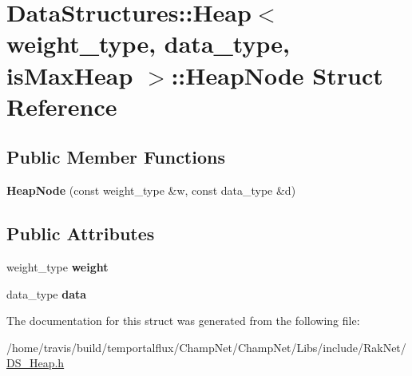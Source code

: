 \hypertarget{struct_data_structures_1_1_heap_1_1_heap_node}{\section{Data\-Structures\-:\-:Heap$<$ weight\-\_\-type, data\-\_\-type, is\-Max\-Heap $>$\-:\-:Heap\-Node Struct Reference}
\label{struct_data_structures_1_1_heap_1_1_heap_node}
}
\subsection*{Public Member Functions}
\begin{DoxyCompactItemize}
\item 
\hypertarget{struct_data_structures_1_1_heap_1_1_heap_node_a3b64e29489c62b0226bd7be578612869}{{\bfseries Heap\-Node} (const weight\-\_\-type \&w, const data\-\_\-type \&d)}\label{struct_data_structures_1_1_heap_1_1_heap_node_a3b64e29489c62b0226bd7be578612869}

\end{DoxyCompactItemize}
\subsection*{Public Attributes}
\begin{DoxyCompactItemize}
\item 
\hypertarget{struct_data_structures_1_1_heap_1_1_heap_node_a5e5aff8b34509387425d3ed21fbca515}{weight\-\_\-type {\bfseries weight}}\label{struct_data_structures_1_1_heap_1_1_heap_node_a5e5aff8b34509387425d3ed21fbca515}

\item 
\hypertarget{struct_data_structures_1_1_heap_1_1_heap_node_a78907004e24fc4a12b48c9c460fd657c}{data\-\_\-type {\bfseries data}}\label{struct_data_structures_1_1_heap_1_1_heap_node_a78907004e24fc4a12b48c9c460fd657c}

\end{DoxyCompactItemize}


The documentation for this struct was generated from the following file\-:\begin{DoxyCompactItemize}
\item 
/home/travis/build/temportalflux/\-Champ\-Net/\-Champ\-Net/\-Libs/include/\-Rak\-Net/\hyperlink{_d_s___heap_8h}{D\-S\-\_\-\-Heap.\-h}\end{DoxyCompactItemize}
